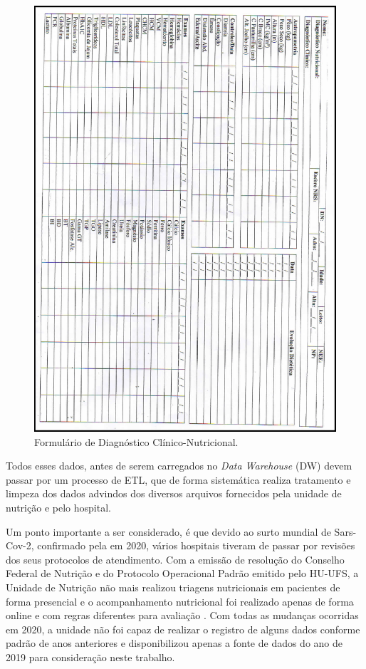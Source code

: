 \begin{figure}[htb]
	\caption{\label{fig_figuraFormularioDiagClinicoNutri}Formulário de Diagnóstico Clínico-Nutricional.}
	\begin{center}
	    \includegraphics[scale=0.569]{Imagens/figura - formulario diagnostico clinico nutricional.png}
	\end{center}
\end{figure}

Todos esses dados, antes de serem carregados no \textit{Data Warehouse} (DW) devem passar por um processo de ETL, que de forma sistemática realiza tratamento e limpeza dos dados advindos dos diversos arquivos fornecidos pela unidade de nutrição e pelo hospital. 

Um ponto importante a ser considerado, é que devido ao surto mundial de Sars-Cov-2, confirmado pela  em 2020, vários hospitais tiveram de passar por revisões dos seus protocolos de atendimento. Com a emissão de resolução do Conselho Federal de Nutrição e do Protocolo Operacional Padrão emitido pelo HU-UFS, a Unidade de Nutrição não mais realizou triagens nutricionais em pacientes de forma presencial e o acompanhamento nutricional foi realizado apenas de forma online e com regras diferentes para avaliação \cite{protocolocovidnutri, cfnutri646}. Com todas as mudanças ocorridas em 2020, a unidade não foi capaz de realizar o registro de alguns dados conforme padrão de anos anteriores e disponibilizou apenas a fonte de dados do ano de 2019 para consideração neste trabalho.

